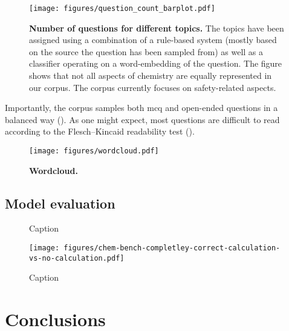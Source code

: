 \documentclass[11pt, oneside]{article}
\begin{document}
\begin{figure}
    \centering
    \texttt{[image: figures/question\_count\_barplot.pdf]}
    \caption{\textbf{Number of questions for different topics.} The topics have been assigned using a combination of a rule-based system (mostly based on the source the question has been sampled from) as well as a classifier operating on a word-embedding of the question. The figure shows that not all aspects of chemistry are equally represented in our corpus. The corpus currently focuses on safety-related aspects.}
    \label{fig:topic_barplot}
\end{figure}

Importantly, the corpus samples both \gls{mcq} and open-ended questions in a balanced way (). As one might expect, most questions are difficult to read according to the Flesch–Kincaid readability test (). \cite{kincaid1975derivation}


\begin{figure}
    \centering 
    \texttt{[image: figures/wordcloud.pdf]}
    \caption{\textbf{Wordcloud.}}
    \label{fig:wordcloud}
\end{figure}


\subsection{Model evaluation}


\begin{figure}
    \centering
    \caption{Caption}
    \label{fig:enter-label}
\end{figure}


\begin{figure}
    \centering
    \texttt{[image: figures/chem-bench-completley-correct-calculation-vs-no-calculation.pdf]}
    \caption{Caption}
    \label{fig:enter-label}
\end{figure}


\section{Conclusions}
\end{document}
